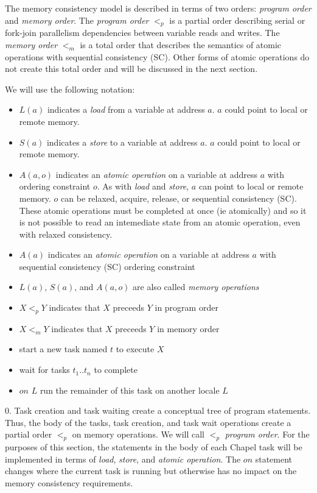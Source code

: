 The memory consistency model is described in terms of two orders:
\textit{program order} and \textit{memory order}. The \textit{program order}
$<_p$ is a partial order describing serial or fork-join parallelism
dependencies between variable reads and writes. The \textit{memory order} $<_m$
is a total order that describes the semantics of atomic operations with
sequential consistency (SC). Other forms of atomic operations do not create
this total order and will be discussed in the next section.

We will use the following notation:
\begin{itemize}

  \item $L(a)$ indicates a \textit{load} from a variable at address $a$.  $a$
could point to local or remote memory.

  \item $S(a)$ indicates a \textit{store} to a variable at address $a$.  $a$
could point to local or remote memory.

  \item $A(a,o)$ indicates an \textit{atomic operation} on a variable at
address $a$ with ordering constraint $o$. As with \textit{load} and
\textit{store}, $a$ can point to local or remote memory. $o$ can be relaxed,
acquire, release, or sequential consistency (SC). These atomic operations must
be completed at once (ie atomically) and so it is not possible to read an
intemediate state from an atomic operation, even with relaxed consistency. 

  \item $A(a)$ indicates an \textit{atomic operation} on a variable at address
$a$ with sequential consistency (SC) ordering constraint

  \item $L(a)$, $S(a)$, and $A(a,o)$ are also called \textit{memory operations}
  \item $X <_p Y$ indicates that $X$ preceeds $Y$ in program order
  \item $X <_m Y$ indicates that $X$ preceeds $Y$ in memory order
  \item {} start a new task named $t$ to execute $X$
  \item {} wait for tasks $t_1..t_n$ to complete
  \item $on$ $L$ run the remainder of this task on another locale $L$
\end{itemize}

0. Task creation and task waiting create a conceptual tree of program
statements. Thus, the body of the tasks, task creation, and task wait
operations create a partial order $<_p$ on memory operations. We will call
$<_p$ \textit{program order}. For the purposes of this section, the statements
in the body of each Chapel task will be implemented in terms of \textit{load},
\textit{store}, and \textit{atomic operation}. The $on$ statement changes where
the current task is running but otherwise has no impact on the memory
consistency requirements.

